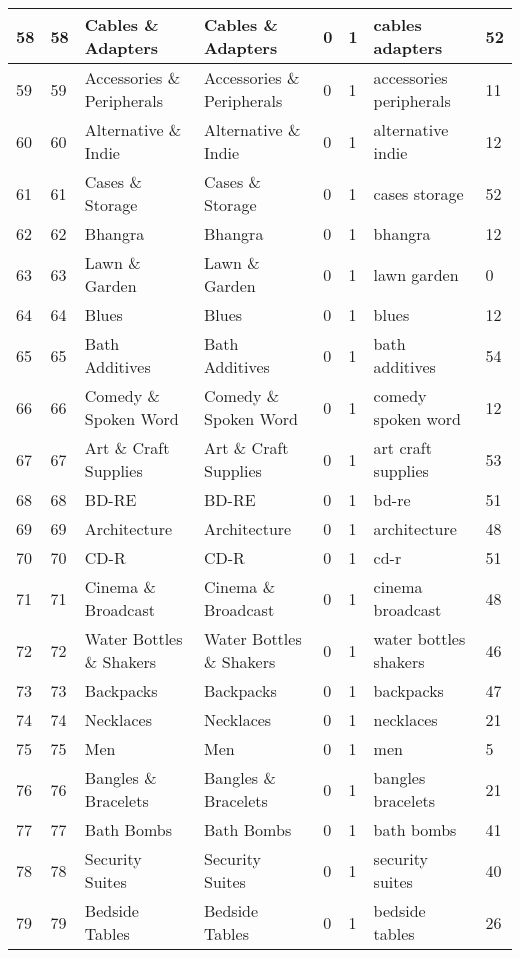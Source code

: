 \begin{longtable}{|l|l|l|l|l|l|l|l|}
58 & 58 & Cables \& Adapters & Cables \& Adapters & 0 & 1 & cables adapters & 52 \\ \hline 
59 & 59 & Accessories \& Peripherals & Accessories \& Peripherals & 0 & 1 & accessories peripherals & 11 \\ \hline 
60 & 60 & Alternative \& Indie & Alternative \& Indie & 0 & 1 & alternative indie & 12 \\ \hline 
61 & 61 & Cases \& Storage & Cases \& Storage & 0 & 1 & cases storage & 52 \\ \hline 
62 & 62 & Bhangra & Bhangra & 0 & 1 & bhangra & 12 \\ \hline 
63 & 63 & Lawn \& Garden & Lawn \& Garden & 0 & 1 & lawn garden & 0 \\ \hline 
64 & 64 & Blues & Blues & 0 & 1 & blues & 12 \\ \hline 
65 & 65 & Bath Additives & Bath Additives & 0 & 1 & bath additives & 54 \\ \hline 
66 & 66 & Comedy \& Spoken Word & Comedy \& Spoken Word & 0 & 1 & comedy spoken word & 12 \\ \hline 
67 & 67 & Art \& Craft Supplies & Art \& Craft Supplies & 0 & 1 & art craft supplies & 53 \\ \hline 
68 & 68 & BD-RE & BD-RE & 0 & 1 & bd-re & 51 \\ \hline 
69 & 69 & Architecture & Architecture & 0 & 1 & architecture & 48 \\ \hline 
70 & 70 & CD-R & CD-R & 0 & 1 & cd-r & 51 \\ \hline 
71 & 71 & Cinema \& Broadcast & Cinema \& Broadcast & 0 & 1 & cinema broadcast & 48 \\ \hline 
72 & 72 & Water Bottles \& Shakers & Water Bottles \& Shakers & 0 & 1 & water bottles shakers & 46 \\ \hline 
73 & 73 & Backpacks & Backpacks & 0 & 1 & backpacks & 47 \\ \hline 
74 & 74 & Necklaces & Necklaces & 0 & 1 & necklaces & 21 \\ \hline 
75 & 75 & Men & Men & 0 & 1 & men & 5 \\ \hline 
76 & 76 & Bangles \& Bracelets & Bangles \& Bracelets & 0 & 1 & bangles bracelets & 21 \\ \hline 
77 & 77 & Bath Bombs & Bath Bombs & 0 & 1 & bath bombs & 41 \\ \hline 
78 & 78 & Security Suites & Security Suites & 0 & 1 & security suites & 40 \\ \hline 
79 & 79 & Bedside Tables & Bedside Tables & 0 & 1 & bedside tables & 26 \\ \hline 

\end{longtable}
